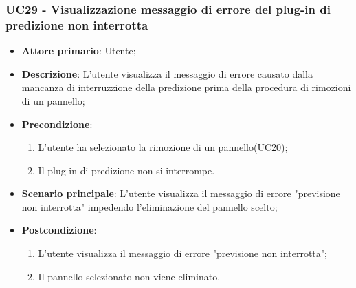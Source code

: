 \subsubsection{UC29 - Visualizzazione messaggio di errore del plug-in di predizione non interrotta}
\label{sssec:uc29}
\begin{itemize}
  \item \textbf{Attore primario}: Utente;
  \item \textbf{Descrizione}: L'utente visualizza il messaggio di errore causato dalla mancanza di interruzzione della predizione prima della procedura di rimozioni di un pannello;
  \item \textbf{Precondizione}:
  \begin{enumerate}
		\item L'utente ha selezionato la rimozione di un pannello(UC20);
		\item Il plug-in di predizione non si interrompe.
	\end{enumerate}
  \item \textbf{Scenario principale}: L'utente visualizza il messaggio di errore "previsione non interrotta" impedendo l'eliminazione del pannello scelto;
  \item \textbf{Postcondizione}:
  \begin{enumerate}
		\item L'utente visualizza il messaggio di errore "previsione non interrotta";
		\item Il pannello selezionato non viene eliminato.
	\end{enumerate}
\end{itemize}
